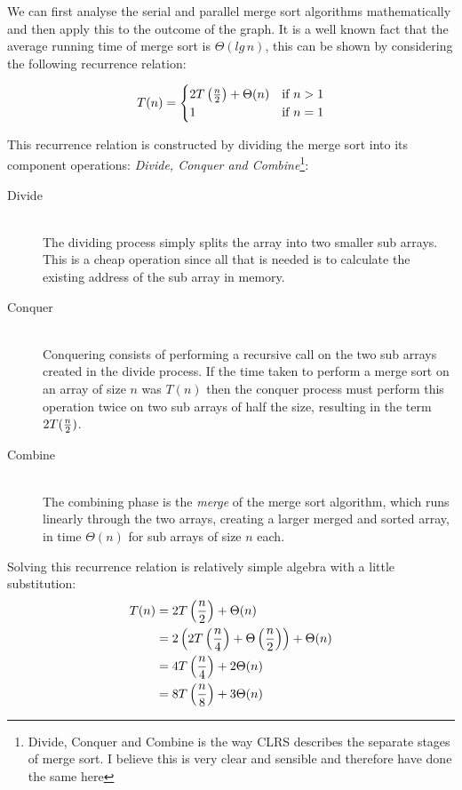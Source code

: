 \documentclass[12pt,twoside,notitlepage]{report}
\begin{document}
We can first analyse the serial and parallel merge sort algorithms mathematically and then apply this to the outcome of the graph. It is a well known fact that the average running time of merge sort is $\Theta(lg\,{n})$, this can be
shown by considering the following recurrence relation:

\[
T(n) = 
    \begin{cases}
    2T\left({n \over 2}\right) + \Theta(n) & \text{if } n > 1 \\
    1 & \text{if } n = 1
    \end{cases}
\]

This recurrence relation is constructed by dividing the merge sort into its component operations: {\em Divide, Conquer and Combine}\footnote{Divide, Conquer and Combine is the way CLRS describes the separate stages of merge sort. I
believe this is very clear and sensible and therefore have done the same here}:

\begin{description}

\item[Divide] \hfill \\
The dividing process simply splits the array into two smaller sub arrays. This is a cheap operation since all that is needed is to calculate the existing address of the sub array in memory.

\item[Conquer] \hfill \\
Conquering consists of performing a recursive call on the two sub arrays created in the divide process. If the time taken to perform a merge sort on an array of size $n$ was $T(n)$ then the conquer process must perform this operation
twice on two sub arrays of half the size, resulting in the term $2T({n \over 2})$.

\item[Combine] \hfill \\
The combining phase is the {\em merge} of the merge sort algorithm, which runs linearly through the two arrays, creating a larger merged and sorted array, in time $\Theta(n)$ for sub arrays of size $n$ each.

\end{description}

Solving this recurrence relation is relatively simple algebra with a little substitution:
\begin{align*}
T(n) &= 2T\left({n \over 2}\right) + \Theta(n) \\
&= 2\left(2T\left({n \over 4}\right) + \Theta\left({n \over 2}\right)\right) + \Theta(n) \\
&= 4T\left({n \over 4}\right) + 2\Theta(n) \\
&= 8T\left({n \over 8}\right) + 3\Theta(n) \\
\end{align*}
\end{document}
